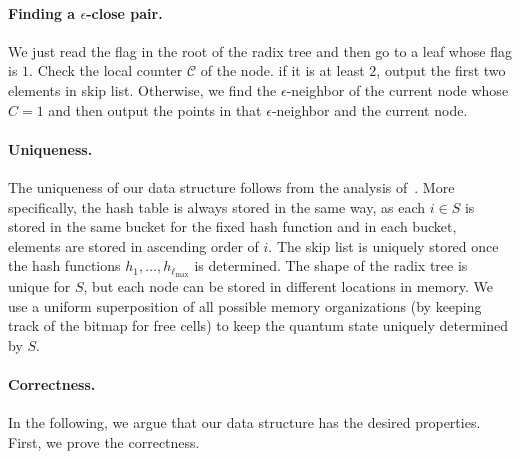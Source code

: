 \paragraph{Finding a $\epsilon$-close pair.} We just read the flag in the root of the radix tree and then go to a leaf whose flag is $1$. Check the local counter $\mathcal{C}$ of the node. if it is at least $2$, output the first two elements in skip list. Otherwise, we find the $\epsilon$-neighbor of the current node whose $C=1$ and then output the points in that $\epsilon$-neighbor and the current node. 


\paragraph{Uniqueness.}
The uniqueness of our data structure follows from the analysis of~\cite{r5,r11,r28}. More specifically, the hash table is always stored in the same way, as each $i \in S$ is stored in the same bucket for the fixed hash function and in each bucket, elements are stored in ascending order of $i$. The skip list is uniquely stored once the hash functions $h_1, \ldots, h_{\ell_{\max}}$ is determined. The shape of the radix tree is unique for $S$, but each node can be stored in different locations in memory. We use a uniform superposition of all possible memory organizations (by keeping track of the bitmap for free cells) to keep the quantum state uniquely determined by $S$.

\paragraph{Correctness.}
In the following, we argue that our data structure has the desired properties. First, we prove the correctness.

